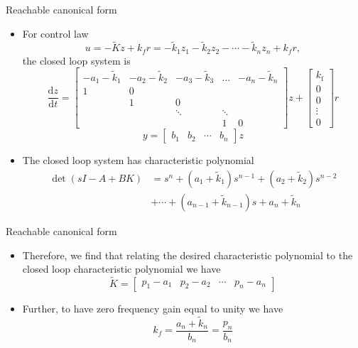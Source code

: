 \documentclass[10pt]{beamer-control}
\begin{document}
\begin{frame}{Reachable canonical form }
	\begin{itemize}
		\item 
		For control law 
		\begin{equation}
			u = -\tilde{K} z + k_f r
			  = -\tilde{k}_1 z_1 - \tilde{k}_2 z_2 - \cdots - \tilde{k}_n z_n + k_f r,
		\end{equation}
		the closed loop system is 
		\small
		\begin{equation}
			\frac{\mathrm{d} z}{\mathrm{d} t}=\begin{bmatrix}
				-a_1-\tilde{k}_1 & -a_2-\tilde{k}_2 & -a_3-\tilde{k}_3 & \ldots & -a_n-\tilde{k}_n \\
				1 & 0 & & & \\
				& 1 & 0 & & \\
				&  & \ddots & \ddots & \\
				& & & 1 & 0
			\end{bmatrix} z+\begin{bmatrix}
				k_{\mathrm{f}} \\
				0 \\
				0 \\
				\vdots \\
				0
			\end{bmatrix} r
		\end{equation}
		\normalsize
		\begin{equation}
			y = \begin{bmatrix}
				b_1 & b_2 & \cdots & b_n
			\end{bmatrix}z
		\end{equation}
		\item The closed loop system has characteristic polynomial
		\begin{align}
		\operatorname{det}(sI-A+BK) &= s^n+\left(a_1+\tilde{k}_1\right) s^{n-1}+\left(a_2+\tilde{k}_2\right) s^{n-2}\\
		&+\cdots+\left(a_{n-1}+\tilde{k}_{n-1}\right) s+a_n+\tilde{k}_n   \end{align}
	\end{itemize}
\end{frame}


\begin{frame}{Reachable canonical form}
\begin{itemize}
	\item Therefore, we find that relating the desired characteristic polynomial to the closed loop characteristic polynomial we have
	\begin{equation}
		\tilde{K} = \begin{bmatrix}
			p_1-a_1 & p_2-a_2 & \cdots & p_n-a_n
		\end{bmatrix}
	\end{equation}
	\item Further, to have zero frequency gain equal to unity we have
	\begin{equation}
		k_f = \frac{a_n+\tilde{k}_n}{b_n}=\frac{p_n}{b_n}
	\end{equation}
\end{itemize}
\end{frame}
\end{document}
